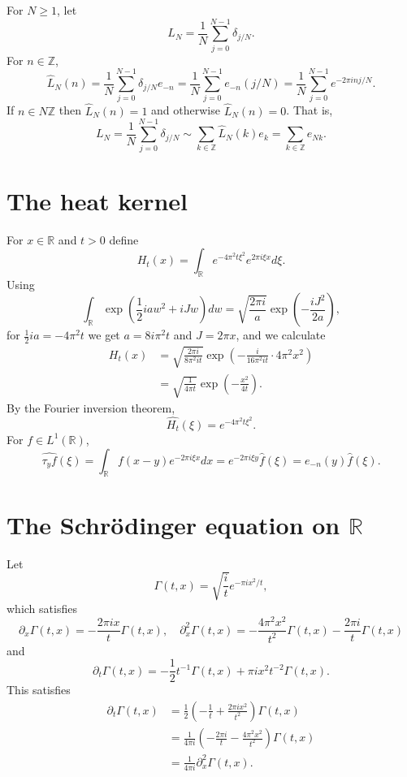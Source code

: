\documentclass{article}
\theoremstyle{definition}
\begin{document}
For $N \geq 1$, let
\[
L_N = \frac{1}{N} \sum_{j=0}^{N-1} \delta_{j/N}.
\]
For $n \in \mathbb{Z}$,
\[
\widehat{L}_N(n) = \frac{1}{N} \sum_{j=0}^{N-1} \delta_{j/N} e_{-n}
=\frac{1}{N} \sum_{j=0}^{N-1} e_{-n}(j/N) 
=\frac{1}{N} \sum_{j=0}^{N-1} e^{-2\pi inj/N}.
\]
If $n \in N \mathbb{Z}$ then $\widehat{L}_N(n) = 1$ and otherwise
$\widehat{L}_N(n)=0$. 
That is,
\[
L_N =  \frac{1}{N} \sum_{j=0}^{N-1} \delta_{j/N} \sim \sum_{k \in \mathbb{Z}} 
\widehat{L}_N(k) e_k
=\sum_{k \in \mathbb{Z}} e_{Nk}.
\]





\section{The heat kernel}
For $x \in \mathbb{R}$ and $t>0$ define
\[
H_t(x) = \int_{\mathbb{R}} e^{-4\pi^2 t \xi^2} e^{2\pi i\xi x} d\xi.
\]
Using
\[
\int_{\mathbb{R}} \exp\left(\frac{1}{2}iaw^2 + iJw\right) dw = \sqrt{ \frac{2\pi i}{a}} \exp\left(-\frac{iJ^2}{2a}\right),
\]
for $\frac{1}{2}ia =-4\pi^2 t$ we get $a=8i \pi^2 t$ and $J=2\pi x$, and we calculate
\begin{align*}
H_t(x)&=\sqrt{\frac{2\pi i}{8\pi^2 it}} \exp\left( -\frac{i}{16\pi^2 it} \cdot 4\pi^2 x^2\right)\\
&=\sqrt{\frac{1}{4\pi t}} \exp\left(-\frac{x^2}{4t} \right).
\end{align*}
By the Fourier inversion theorem,
\[
\widehat{H_t}(\xi) = e^{-4\pi^2 t\xi^2}.
\]
For $f \in L^1(\mathbb{R})$, 
\[
\widehat{\tau_y f}(\xi) = \int_{\mathbb{R}} f(x-y) e^{-2\pi i\xi x} dx
=e^{-2\pi i\xi y} \widehat{f}(\xi) = e_{-n}(y) \widehat{f}(\xi).
\]




\section{The Schr\"odinger equation on $\mathbb{R}$}
Let
\[
\Gamma(t,x) =\sqrt{\frac{i}{t}} e^{-\pi ix^2/t},
\]
which satisfies
\[
\partial_x \Gamma(t,x) = -\frac{2\pi ix}{t} \Gamma(t,x),
\quad \partial_x^2 \Gamma(t,x) = -\frac{4\pi^2 x^2}{t^2} \Gamma(t,x)
-\frac{2\pi i}{t} \Gamma(t,x)
\]
and
\[
\partial_t \Gamma(t,x) = -\frac{1}{2} t^{-1} \Gamma(t,x)+ \pi i x^2 t^{-2} \Gamma(t,x).
\]
This satisfies
\begin{align*}
\partial_t \Gamma(t,x)&=\frac{1}{2}  \left(-\frac{1}{t} + \frac{2\pi i x^2}{t^2}\right)\Gamma(t,x)\\
&=\frac{1}{4\pi i} \left( -\frac{2\pi i}{t} - \frac{4\pi^2x^2}{t^2}\right)\Gamma(t,x)\\
&=\frac{1}{4\pi i} \partial_x^2 \Gamma(t,x).
\end{align*}
\end{document}
